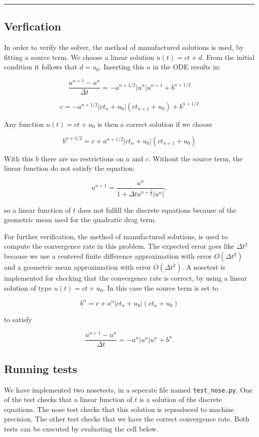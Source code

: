 \documentclass[letterpaper,10pt,english]{/usr/share/sphinx/texinputs/sphinxhowto}
\begin{document}
\begin{center}\rule{3in}{0.4pt}\end{center}

\subsection{Verfication}

In order to verify the solver, the method of manufactured solutions is
used, by fitting a source term. We choose a linear solution $u(t)=ct+d$.
From the initial condition it follows that $d=u_0$. Inserting this $u$
in the ODE results in:

\[ \frac{u^{n+1}-u^{n}}{\Delta t} = - a^{n+1/2} \vert u^{n}\vert  u^{n+1} + b^{n+1/2}\]

\[ c = - a^{n+1/2} \vert ct_n+u_0\vert  (ct_{n+1}+u_0) + b^{n+1/2}\]

Any function $u(t)=ct+u_0$ is then a correct solution if we choose

\[b^{n+1/2} = c +a^{n+1/2} \vert ct_n+u_0\vert  (ct_{n+1}+u_0) \]

With this $b$ there are no restrictions on $a$ and $c$. Without the
source term, the linear function do not satisfy the equation:

\[ u^{n+1} = \frac{u^n}{1 + \Delta t a^{n+\frac{1}{2}}\vert u^{n}\vert },\]

so a linear function of $t$ does not fulfill the discrete equations
because of the geometric mean used for the quadratic drag term.

For further verification, the method of manufactured solutions, is used
to compute the convergence rate in this problem. The expected error goes
like $\Delta t^2$ because we use a centered finite difference
approximation with error $O(\Delta t^2)$ and a geometric mean
approximation with error $O(\Delta t^2)$. A nosetest is implemented for
checking that the convergence rate is correct, by using a linear
solution of type $u(t)=ct+u_0$. In this case the source term is set to

\[b^{n} = c +a^{n} \vert ct_n+u_0\vert  (ct_n+u_0) \]

to satisfy

\[ \frac{u^{n+1}-u^{n}}{\Delta t} = - a^{n} \vert u^{n}\vert  u^{n} + b^{n}.\]\subsection{Running tests}

We have implemented two nosetests, in a seperate file named
\texttt{test\_nose.py}. One of the test checks that a linear function of
$t$ is a solution of the discrete equations. The nose test checks that
this solution is reproduced to machine precision. The other test checks
that we have the correct convergence rate. Both tests can be executed by
evaluating the cell below.
\end{document}

